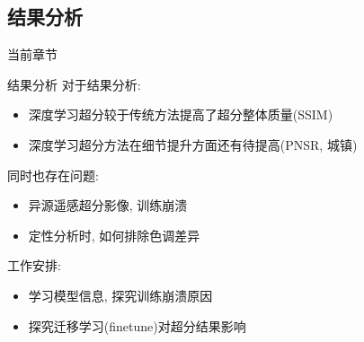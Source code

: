 \subsection{结果分析}

\begin{frame}{当前章节}
\end{frame}

\begin{frame}{结果分析}
    对于结果分析:
    \begin{itemize}
        \item 深度学习超分较于传统方法提高了超分整体质量(SSIM)
        \item 深度学习超分方法在细节提升方面还有待提高(PNSR, 城镇)
    \end{itemize}
    同时也存在问题:
    \begin{itemize}
        \item 异源遥感超分影像, 训练崩溃
        \item 定性分析时, 如何排除色调差异
    \end{itemize}
    工作安排:
    \begin{itemize}
        \item 学习模型信息, 探究训练崩溃原因
        \item 探究迁移学习(finetune)对超分结果影响
    \end{itemize}
\end{frame}